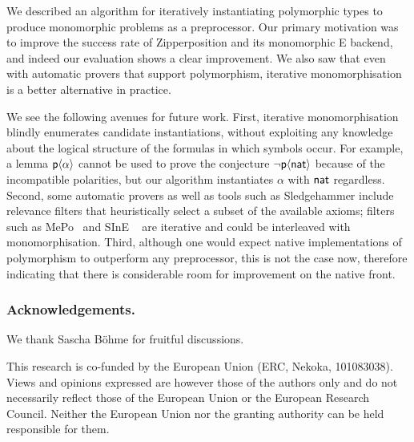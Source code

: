 \documentclass[runningheads]{llncs}
\begin{document}
We described an algorithm for iteratively instantiating polymorphic types to
produce monomorphic problems as a preprocessor. Our primary motivation was to
improve the success rate of Zipperposition and its monomorphic E backend, and
indeed our evaluation shows a clear improvement. We also saw that even with
automatic provers that support polymorphism, iterative monomorphisation is a
better alternative in practice.

We see the following avenues for future work. First, iterative monomorphisation
blindly enumerates candidate instantiations, without exploiting any knowledge
about the logical structure of the formulas in which symbols occur. For
example, a lemma $\textsf{p}\langle\alpha\rangle$ cannot be used to prove the
conjecture $\lnot \textsf{p}\langle\textsf{nat}\rangle$ because of the incompatible
polarities, but our algorithm instantiates $\alpha$ with $\textsf{nat}$ regardless.
Second, some automatic provers as well as tools such as Sledgehammer include
relevance filters that heuristically select a subset of the available axioms;
filters such as MePo~\cite{meng-paulson-2009} and SInE
~\cite{hoder-voronkov-2011} are iterative and could be interleaved with
monomorphisation. Third, although one would expect native implementations of
polymorphism to outperform any preprocessor, this is not the case now, therefore indicating that there is considerable room for improvement on the native front.

\begin{credits}
   \subsubsection{Acknowledgements.}

   We thank Sascha Böhme for fruitful discussions.

   This research is co-funded by the European Union (ERC, Nekoka, 101083038). Views and opinions expressed are however those of the authors only and do not necessarily reflect those of the European Union or the European Research Council. Neither the European Union nor the granting authority can be held responsible for them.
\end{credits}



\end{document}
